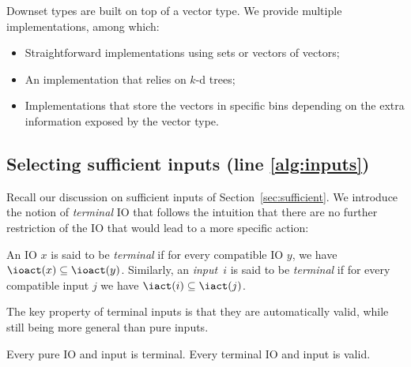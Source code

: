 \documentclass[sigconf,screen,nonacm]{acmart}
\begin{document}
Downset types are built on top of a vector type.  We provide multiple
implementations, among which:
\begin{itemize}
\item Straightforward implementations using sets or vectors of vectors;
\item An implementation that relies on \(k\)-d trees;
\item Implementations that store the vectors in specific bins depending on the
  extra information exposed by the vector type.
\end{itemize}

\subsection{Selecting sufficient inputs (line \ref{alg:inputs})}


Recall our discussion on sufficient inputs of Section~\ref{sec:sufficient}.  We
introduce the notion of \emph{terminal} IO that follows the intuition that there
are no further restriction of the IO that would lead to a more specific action:
\begin{definition}
  An IO \(x\) is said to be \emph{terminal} if for every compatible IO \(y\), we
  have \(\ioact(x) \subseteq \ioact(y)\).  Similarly, an \emph{input}~\(i\) is said to be
  \emph{terminal} if for every compatible input \(j\) we have
  \(\iact(i) \subseteq \iact(j)\).
\end{definition}

The key property of terminal inputs is that they are automatically valid, while
still being more general than pure inputs.
\begin{proposition}
  Every pure IO and input is terminal.  Every terminal IO and input is valid.
\end{proposition}
\end{document}
